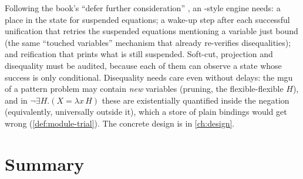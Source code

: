 \begin{kanren}
Following the book's \enquote{defer further consideration} , an \micro{}-style engine needs: a
place in the state for suspended equations; a wake-up step after each successful unification that retries the
suspended equations mentioning a variable just bound (the same \enquote{touched variables} mechanism that already
re-verifies disequalities); and reification that prints what is still suspended. Soft-cut, projection and
disequality must be audited, because each of them can observe a state whose success is only conditional.
Disequality needs care even without delays: the mgu of a pattern problem may contain \emph{new} variables
(pruning, the flexible-flexible $H$), and in $\neg\exists H.(X=\lambda x\,H)$ these are existentially quantified
inside the negation (equivalently, universally outside it), which a store of plain bindings would get wrong
(\cref{def:module-trial}). The concrete design is in \cref{ch:design}.
\end{kanren}

\section{Summary}\label{sec:hounif-summary}

